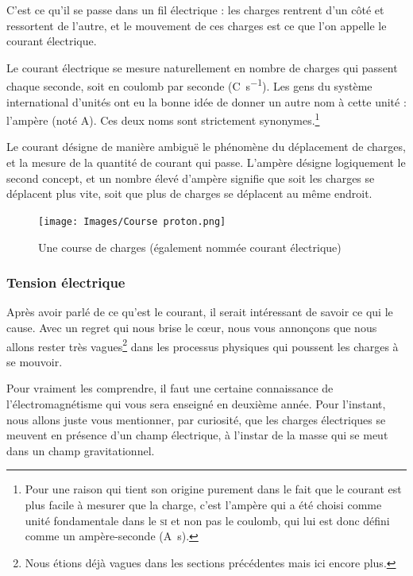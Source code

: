 \documentclass{article}
\begin{document}
C'est ce qu'il se passe dans un fil électrique : les charges rentrent d'un côté et ressortent de l'autre, et le mouvement de ces charges est ce que l'on appelle le courant électrique.

Le courant électrique se mesure naturellement en nombre de charges qui passent chaque seconde, soit en coulomb par seconde (\si{\coulomb\per\second}). Les gens du système international d'unités ont eu la bonne idée de donner un autre nom à cette unité : l'ampère (noté \si{\ampere}). Ces deux noms sont strictement synonymes.\footnote{Pour une raison qui tient son origine purement dans le fait que le courant est plus facile à mesurer que la charge, c'est l'ampère qui a été choisi comme unité fondamentale dans le \textsc{si} et non pas le coulomb, qui lui est donc défini comme un ampère-seconde (\si{\ampere\second}).}

Le courant désigne de manière ambiguë le phénomène du déplacement de charges, et la mesure de la quantité de courant qui passe. L'ampère désigne logiquement le second concept, et un nombre élevé d'ampère signifie que soit les charges se déplacent plus vite, soit que plus de charges se déplacent au même endroit.

\begin{figure}[h]
\centering
\texttt{[image: Images/Course proton.png]}
\caption{Une course de charges (également nommée courant électrique)}
\end{figure}

\subsubsection{Tension électrique}

Après avoir parlé de ce qu'est le courant, il serait intéressant de savoir ce qui le cause. Avec un regret qui nous brise le c\oe{}ur, nous vous annonçons que nous allons rester très vagues\footnote{Nous étions déjà vagues dans les sections précédentes mais ici encore plus.} dans les processus physiques qui poussent les charges à se mouvoir.

Pour vraiment les comprendre, il faut une certaine connaissance de l'électromagnétisme qui vous sera enseigné en deuxième année. Pour l'instant, nous allons juste vous mentionner, par curiosité, que les charges électriques se meuvent en présence d'un champ électrique, à l'instar de la masse qui se meut dans un champ gravitationnel.
\end{document}
